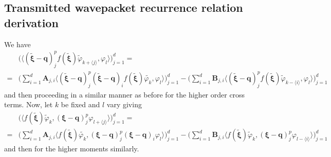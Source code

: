 \documentclass[12pt]{article}
\numberwithin{equation}{section}
\begin{document}
\begin{appendices}
\section{Transmitted wavepacket recurrence relation derivation}
We have
\begin{equation}
  \begin{split}
    &\Big(
      \langle 
      (\tilde{\bm{\xi}}-\bm{q})_j^p 
      f(\tilde{\bm{\xi}})
      \tilde{\varphi}_{k + \langle j \rangle},
    \varphi_l \rangle
  \Big)_{j=1}^d
    =
    \\
      =&
    \Big(
      \sum_{i=1}^d
     \bm{A}_{j,i} 
     \langle (\tilde{\bm{\xi}}-\bm{q})^p_j
     (\tilde{\bm{\xi}}-\bm{q})_{i}
      f(\tilde{\bm{\xi}})
      \tilde{\varphi_k}, 
      \varphi_l \rangle
    \Big)_{j=1}^d
    - \Big(
      \sum_{i=1}^d
      \bm{B}_{j,i}
      \langle 
      (\tilde{\bm{\xi}}-\bm{q})_j^p
      f(\tilde{\bm{\xi}})
      \tilde{\varphi}_{k - \langle i  \rangle}
      , \varphi_l \rangle
      \Big)_{j=1}^d
  \end{split}
\end{equation}
and then proceeding in a similar manner as before 
for the higher order cross terms. 
Now, let $k$ be fixed and $l$ vary giving 
\begin{equation}
  \begin{split}
    &\Big(
      \langle 
      f(\tilde{\bm{\xi}})
      \tilde{\varphi}_{k },
    (\bm{\xi}-\bm{q})_j^p 
    \varphi_{l+ \langle j \rangle}  \rangle
  \Big)_{j=1}^d
    =
    \\
      =&
    \Big(
      \sum_{i=1}^d
     \bm{A}_{j,i} 
     \langle 
      f(\tilde{\bm{\xi}})
      \tilde{\varphi_k}, 
     (\bm{\xi}-\bm{q})^p_j
     (\bm{\xi}-\bm{q})_{i}
      \varphi_l \rangle
    \Big)_{j=1}^d
    - \Big(
      \sum_{i=1}^d
      \bm{B}_{j,i}
      \langle 
      f(\tilde{\bm{\xi}})
      \tilde{\varphi}_{k}
      ,
      (
      \bm{\xi}-\bm{q})_j^p
      \varphi_{l- \langle i  \rangle} 
      \rangle
      \Big)_{j=1}^d
  \end{split}
\end{equation}
and then for the higher moments similarly.

\end{appendices}
\end{document}
